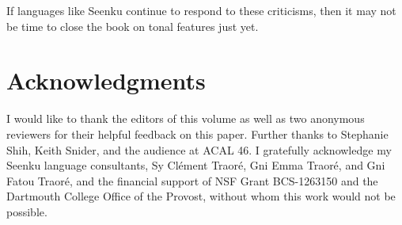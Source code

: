 \documentclass[output=paper]{langsci/langscibook}
\begin{document}
If languages like Seenku continue to respond to these criticisms, then it may not be time to close the book on tonal features just yet.

\section*{Acknowledgments}

I would like to thank the editors of this volume as well as two anonymous reviewers for their helpful feedback on this paper. Further thanks to Stephanie Shih, Keith Snider, and the audience at ACAL 46. I gratefully acknowledge my Seenku language consultants, Sy Cl\'ement Traor\'e, Gni Emma Traor\'e, and Gni Fatou Traor\'e, and the financial support of NSF Grant BCS-1263150 and the Dartmouth College Office of the Provost, without whom this work would not be possible.

\printbibliography[heading=subbibliography,notkeyword=this]
\end{document}
